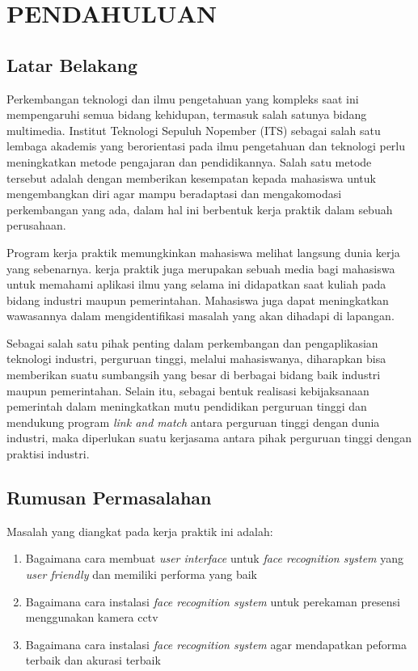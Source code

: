 \chapter{PENDAHULUAN}


\section{Latar Belakang}

  Perkembangan teknologi dan ilmu pengetahuan yang kompleks saat ini mempengaruhi semua bidang kehidupan, termasuk salah satunya bidang multimedia. Institut Teknologi Sepuluh Nopember (ITS) sebagai salah satu lembaga akademis yang berorientasi pada ilmu pengetahuan dan teknologi perlu meningkatkan metode pengajaran dan pendidikannya. Salah satu metode tersebut adalah dengan memberikan kesempatan kepada mahasiswa untuk mengembangkan diri agar mampu beradaptasi dan mengakomodasi perkembangan yang ada, dalam hal ini berbentuk kerja praktik dalam sebuah perusahaan.
  
  Program kerja praktik memungkinkan mahasiswa melihat langsung dunia kerja yang sebenarnya. kerja praktik juga merupakan sebuah media bagi mahasiswa untuk memahami aplikasi ilmu yang selama ini didapatkan saat kuliah pada bidang industri maupun pemerintahan. Mahasiswa juga dapat meningkatkan wawasannya dalam mengidentifikasi masalah yang akan dihadapi di lapangan.

  
  Sebagai salah satu pihak penting dalam perkembangan dan pengaplikasian teknologi industri, perguruan tinggi, melalui mahasiswanya, diharapkan bisa memberikan suatu sumbangsih yang besar di berbagai bidang baik industri maupun pemerintahan. Selain itu, sebagai bentuk realisasi kebijaksanaan pemerintah dalam meningkatkan mutu pendidikan perguruan tinggi dan mendukung program \textit{link and match} antara perguruan tinggi dengan dunia industri, maka diperlukan suatu kerjasama antara pihak perguruan tinggi dengan praktisi industri.


\section{Rumusan Permasalahan}

Masalah yang diangkat pada kerja praktik ini adalah:

\begin{enumerate}[nolistsep]

  \item Bagaimana cara membuat \textit{user interface} untuk \textit{face recognition system} yang \textit{user friendly} dan memiliki performa yang baik
  
  \item Bagaimana cara instalasi \textit{face recognition system} untuk perekaman presensi menggunakan kamera cctv

  \item Bagaimana cara instalasi \textit{face recognition system} agar mendapatkan peforma terbaik dan akurasi terbaik

\end{enumerate}

